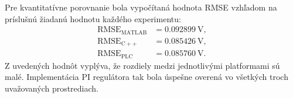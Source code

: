 Pre kvantitatívne porovnanie bola vypočítaná hodnota RMSE vzhľadom na príslušnú
žiadanú hodnotu každého experimentu:
\begin{align}
    \mathrm{RMSE}_{\mathrm{MATLAB}} &= 0.092899~\mathrm{V}, \\
    \mathrm{RMSE}_{\mathrm{C++}} &= 0.085426~\mathrm{V}, \\
    \mathrm{RMSE}_{\mathrm{PLC}} &= 0.085760~\mathrm{V}.
\end{align}
Z uvedených hodnôt vyplýva, že rozdiely medzi jednotlivými platformami sú malé.
Implementácia PI regulátora tak bola úspešne overená vo všetkých troch
uvažovaných prostrediach.

\clearpage